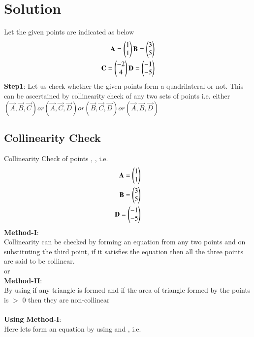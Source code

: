 \documentclass[journal,12pt,twocolumn]{IEEEtran}
\begin{document}
\section{Solution}
Let the given points are indicated as below\\

\begin{align}
\mathbf{\textbf{A}} = \begin{pmatrix}1 \\ 1\end{pmatrix}
\mathbf{\textbf{B}} = \begin{pmatrix}3 \\ 5\end{pmatrix}\\
\mathbf{\textbf{C}} = \begin{pmatrix}-2 \\ 4\end{pmatrix}
\mathbf{\textbf{D}} = \begin{pmatrix}-1 \\ -5\end{pmatrix}\\
\end{align}
\textbf{Step1}: Let us check whether the given points form a quadrilateral or not. This can be ascertained by collinearity check of any two sets of points i.e.
						either \begin{math}
						    	(\vec{A}, \vec{B}, \vec{C}) or (\vec{A}, \vec{C}, \vec{D}) or (\vec{B}, \vec{C}, \vec{D}) or (\vec{A}, \vec{B}, \vec{D})					\end{math}

\subsection{\textbf{Collinearity Check}}
Collinearity Check of points , ,  i.e. 
\begin{align}
\mathbf{A} = \begin{pmatrix}1 \\ 1\end{pmatrix}\\
\mathbf{B} = \begin{pmatrix}3 \\ 5\end{pmatrix}\\
\mathbf{D} = \begin{pmatrix}-1 \\ -5\end{pmatrix}\\
\end{align}
\textbf{Method-I}:
\\Collinearity can be checked by forming an equation from any two points and on substituting the third point, if it satisfies the equation then all the three points are said to be collinear. \\ or\\
\textbf{Method-II}:
\\ By using if any triangle is formed and if the area of triangle formed by the points is $>$ 0 then they are non-collinear
\\
\\
\textbf{Using Method-I}:\\
Here lets form an equation by using  and , i.e.  
\\
\end{document}
